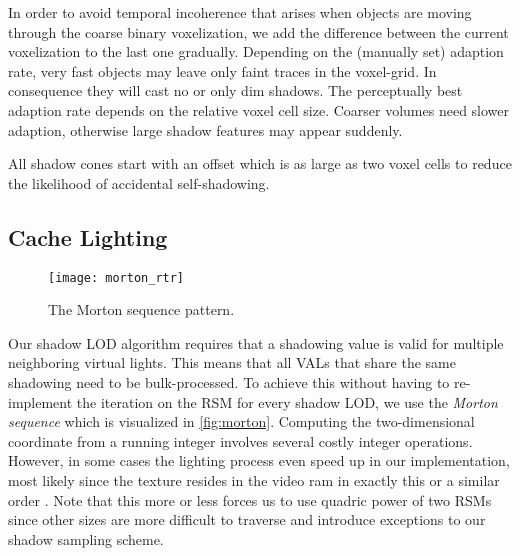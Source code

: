 \documentclass[thesis.tex]{subfiles}
\begin{document}
In order to avoid temporal incoherence that arises when objects are moving through the coarse binary voxelization, we add the difference between the current voxelization to the last one gradually.
Depending on the (manually set) adaption rate, very fast objects may leave only faint traces in the voxel-grid.
In consequence they will cast no or only dim shadows.
The perceptually best adaption rate depends on the relative voxel cell size.
Coarser volumes need slower adaption, otherwise large shadow features may appear suddenly.

All shadow cones start with an offset which is as large as two voxel cells to reduce the likelihood of accidental self-shadowing. 

\subsection{Cache Lighting} \label{sec:impl:details:lighting}
\begin{figure}[h]
\centering
\texttt{[image: morton\_rtr]}
\caption{\cite[p.848]{bib:RealtimeRenderingBook} The Morton sequence pattern. } \label{fig:morton}
\end{figure}
Our shadow LOD algorithm requires that a shadowing value is valid for multiple neighboring virtual lights.
This means that all VALs that share the same shadowing need to be bulk-processed.
To achieve this without having to re-implement the iteration on the RSM for every shadow LOD, we use the \emph{Morton sequence} \cite{bib:mortonorder} which is visualized in \autoref{fig:morton}.
Computing the two-dimensional coordinate from a running integer involves several costly integer operations.
However, in some cases the lighting process even speed up in our implementation, most likely since the texture resides in the video ram in exactly this or a similar order \cite[p.848]{bib:RealtimeRenderingBook}.
Note that this more or less forces us to use quadric power of two RSMs since other sizes are more difficult to traverse and introduce exceptions to our shadow sampling scheme.
\end{document}
